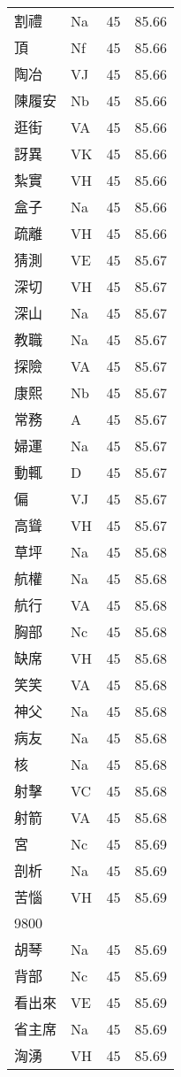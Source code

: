\documentclass[twocolumn]{book}
\begin{document}
\begin{supertabular}{llrr}
割禮 & Na & 45 &  85.66\\
頂 & Nf & 45 &  85.66\\
陶冶 & VJ & 45 &  85.66\\
陳履安 & Nb & 45 &  85.66\\
逛街 & VA & 45 &  85.66\\
訝異 & VK & 45 &  85.66\\
紮實 & VH & 45 &  85.66\\
盒子 & Na & 45 &  85.66\\
疏離 & VH & 45 &  85.66\\
猜測 & VE & 45 &  85.67\\
深切 & VH & 45 &  85.67\\
深山 & Na & 45 &  85.67\\
教職 & Na & 45 &  85.67\\
探險 & VA & 45 &  85.67\\
康熙 & Nb & 45 &  85.67\\
常務 & A & 45 &  85.67\\
婦運 & Na & 45 &  85.67\\
動輒 & D & 45 &  85.67\\
偏 & VJ & 45 &  85.67\\
高聳 & VH & 45 &  85.67\\
草坪 & Na & 45 &  85.68\\
航權 & Na & 45 &  85.68\\
航行 & VA & 45 &  85.68\\
胸部 & Nc & 45 &  85.68\\
缺席 & VH & 45 &  85.68\\
笑笑 & VA & 45 &  85.68\\
神父 & Na & 45 &  85.68\\
病友 & Na & 45 &  85.68\\
核 & Na & 45 &  85.68\\
射擊 & VC & 45 &  85.68\\
射箭 & VA & 45 &  85.68\\
宮 & Nc & 45 &  85.69\\
剖析 & Na & 45 &  85.69\\
苦惱 & VH & 45 &  85.69\\
9800\\
胡琴 & Na & 45 &  85.69\\
背部 & Nc & 45 &  85.69\\
看出來 & VE & 45 &  85.69\\
省主席 & Na & 45 &  85.69\\
洶湧 & VH & 45 &  85.69\\

\end{supertabular}
\end{document}
